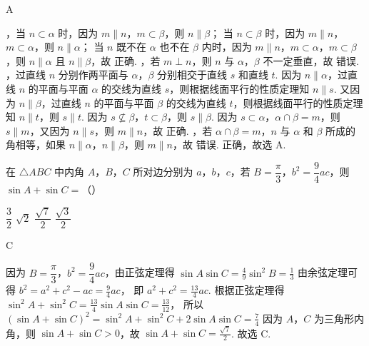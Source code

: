 \begin{answer}
A
\end{answer}

\begin{solution}
，当 \( n\subset \alpha \) 时，因为 \( m\parallel n \)，\( m\subset \beta \)，则 \( n\parallel\beta \)；
当 \( n\subset \beta \) 时，因为 \( m\parallel n \)，\( m\subset \alpha \)，则 \( n\parallel\alpha \)；
当 \( n \) 既不在 \( \alpha \) 也不在 \( \beta \) 内时，因为 \( m\parallel n \)，\( m\subset \alpha \)，\( m\subset \beta \)，则 \( n\parallel\alpha \) 且 \( n\parallel\beta \)，故  正确.
，若 \( m\perp n \)，则 \( n \) 与 \(\alpha\)，\(\beta\) 不一定垂直，故  错误.
，过直线 \( n \) 分别作两平面与 \(\alpha\)，\(\beta\) 分别相交于直线 \( s \) 和直线 \( t \). 因为 \( n\parallel\alpha \)，过直线 \( n \) 的平面与平面 \( \alpha \) 的交线为直线 \( s \)，则根据线面平行的性质定理知 \( n\parallel s \). 又因为 \( n\parallel\beta \)，过直线 \( n \) 的平面与平面 \( \beta \) 的交线为直线 \( t \)，则根据线面平行的性质定理知 \( n\parallel t \)，则 \( s\parallel t \). 因为 \( s\nsubseteq \beta \)，\( t\subset \beta \)，则 \( s\parallel\beta \). 因为 \( s\subset \alpha \)，\( \alpha\cap\beta=m \)，则 \( s\parallel m \)，又因为 \( n\parallel s \)，则 \( m\parallel n \)，故  正确.
，若 \( \alpha\cap\beta=m \)，\( n \) 与 \( \alpha \) 和 \( \beta \) 所成的角相等，如果 \( n\parallel\alpha \)，\( n\parallel\beta \)，则 \( m\parallel n \)，故  错误.
 正确，故选 A.
\end{solution}

\begin{problem}
在 \( \triangle ABC \) 中内角 \(A\)，\(B\)，\(C\) 所对边分别为 \(a\)，\(b\)，\(c\)，若 \( B=\dfrac{\pi}{3} \)，\( b^2=\dfrac{9}{4}ac \)，则 \( \sin A+\sin C= \)（\quad）

\choices
    {\( \dfrac{3}{2} \)}
    {\( \sqrt{2} \)}
    {\( \dfrac{\sqrt{7}}{2} \)}
    {\( \dfrac{\sqrt{3}}{2} \)}
\end{problem}

\begin{answer}
C
\end{answer}

\begin{solution}
因为 \( B=\dfrac{\pi}{3} \)，\( b^2=\dfrac{9}{4}ac \)，由正弦定理得
\(
\sin A\sin C=\frac{4}{9}\sin^2 B=\frac{1}{3}
\)
由余弦定理可得
\(b^2=a^2+c^2-ac=\frac{9}{4}ac\)，
即
\(a^2+c^2=\frac{13}{4}ac\).
根据正弦定理得
\(
\sin^2 A+\sin^2 C=\frac{13}{4}\sin A\sin C=\frac{13}{12}
\)，
所以
\(
\left( \sin A+\sin C \right)^2=\sin^2 A+\sin^2 C+2\sin A\sin C=\frac{7}{4}
\)
因为 \(A\)，\(C\) 为三角形内角，则 \( \sin A+\sin C>0 \)，故
\(\sin A+\sin C=\frac{\sqrt{7}}{2}\).
故选 C.
\end{solution}

